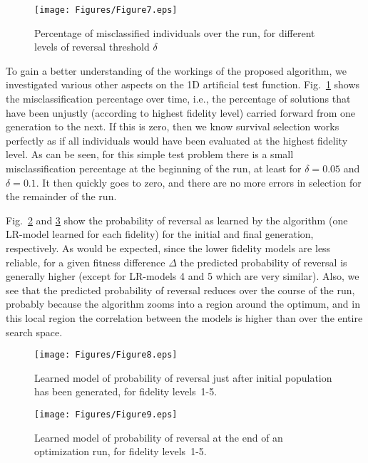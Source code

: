 \begin{figure}[!htb]
	\centering
	\texttt{[image: Figures/Figure7.eps]}
	\caption{Percentage of misclassified individuals over the run, for different levels of reversal threshold $\delta$}
	\label{fig:simpleMisclassify}
\end{figure} 


To gain a better understanding of the workings of the proposed algorithm, we investigated various other aspects on the 1D artificial test function. 
Fig.~\ref{fig:simpleMisclassify} shows the misclassification percentage over time, i.e., the percentage of solutions that have been unjustly (according to highest fidelity level) carried forward from one generation to the next. If this is zero, then we know survival selection works perfectly as if all individuals would have been evaluated at the highest fidelity level. As can be seen, for this simple test problem there is a small misclassification percentage at the beginning of the run, at least for  $\delta=0.05$ and $\delta=0.1$. It then quickly goes to zero, and there are no more errors in selection for the remainder of the run.

Fig.~\ref{fig:LRmodelInit} and \ref{fig:LRmodelFinal} show the probability of reversal as learned by the algorithm (one LR-model learned for each fidelity) for the initial and final generation, respectively. As would be expected, since the lower fidelity models are less reliable, for a given fitness difference $\Delta$ the predicted probability of reversal is generally higher (except for LR-models 4 and 5 which are very similar). Also, we see that the predicted probability of reversal reduces over the course of the run, probably because the algorithm zooms into a region around the optimum, and in this local region the correlation between the models is higher than over the entire search space.

\begin{figure}[!htb]
	\centering
	\texttt{[image: Figures/Figure8.eps]}
	\caption{Learned model of probability of reversal just after initial population has been generated, for fidelity levels~1-5.}
	\label{fig:LRmodelInit}
\end{figure} 

\begin{figure}[!htb]
	\centering
	\texttt{[image: Figures/Figure9.eps]}
	\caption{Learned model of probability of reversal at the end of an optimization run, for fidelity levels~1-5.}
	\label{fig:LRmodelFinal}
\end{figure} 

